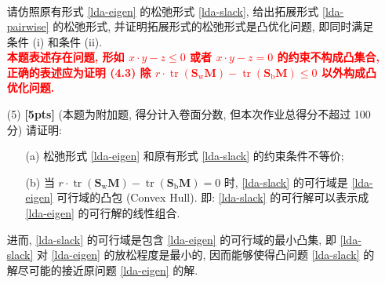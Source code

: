 \documentclass[a4paper]{article}
\numberwithin{equation}{section}
\theoremstyle{definition}
\def \Sw {\mathbf{S}_{\operatorname{w}}}
\def \Sb {\mathbf{S}_{\operatorname{b}}}
\def \M {\mathbf{M}}
\newcommand\sbr[1]{\left( #1 \right)}
\newcommand\tr[1]{\operatorname{tr}\sbr{#1}}
\begin{document}
\begin{enumerate}
\begin{equation}
\begin{aligned}
              \end{aligned}
              \label{lda-slack}
          \end{equation}
          请仿照原有形式 \eqref{lda-eigen} 的松弛形式 \eqref{lda-slack}, 给出拓展形式 \eqref{lda-pairwise} 的松弛形式, 并证明拓展形式的松弛形式是凸优化问题, 即同时满足条件 (i) 和条件 (ii). \\
          \textcolor{red}{\textbf{本题表述存在问题, 形如 $x \cdot y - z \leqslant 0$ 或者 $x \cdot y - z = 0$ 的约束不构成凸集合, 正确的表述应为证明 (4.3) 除 $r \cdot \tr{\Sw \M} - \tr{\Sb \M} \leqslant 0$ 以外构成凸优化问题.}}
    \item[(5)] \textbf{[5pts]} (\textsf{本题为附加题, 得分计入卷面分数, 但本次作业总得分不超过 100 分}) 请证明:
          \begin{itemize}
              \item [(a)] 松弛形式 \eqref{lda-eigen} 和原有形式 \eqref{lda-slack} 的约束条件不等价;
              \item [(b)] 当 $r \cdot \tr{\Sw \M} - \tr{\Sb \M} = 0$ 时, \eqref{lda-slack} 的可行域是 \eqref{lda-eigen} 可行域的凸包 (Convex Hull). 即: \eqref{lda-slack} 的可行解可以表示成 \eqref{lda-eigen} 的可行解的线性组合.
          \end{itemize}
          进而, \eqref{lda-slack} 的可行域是包含 \eqref{lda-eigen} 的可行域的最小凸集, 即 \eqref{lda-slack} 对 \eqref{lda-eigen} 的放松程度是最小的, 因而能够使得凸问题 \eqref{lda-slack} 的解尽可能的接近原问题 \eqref{lda-eigen} 的解.
\end{enumerate}
\end{document}
